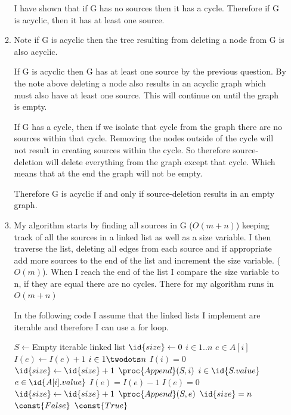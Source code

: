 \documentclass[10pt,a4paper]{article}
\begin{document}
\begin{enumerate}
\begin{enumerate}
I have shown that if G has no sources then it has a cycle. Therefore if G is acyclic, then it has at least one source.

\item
Note if G is acyclic then the tree resulting from deleting a node from G is also acyclic.

If G is acyclic then G has at least one source by the previous question. By the note above deleting a node also results in an acyclic graph which must also have at least one source. This will continue on until the graph is empty.

If G has a cycle, then if we isolate that cycle from the graph there are no sources within that cycle. Removing the nodes outside of the cycle will not result in creating sources within the cycle. So therefore source-deletion will delete everything from the graph except that cycle. Which means that at the end the graph will not be empty. 

Therefore G is acyclic if and only if source-deletion results in an empty graph.
\item My algorithm starts by finding all sources in G ($O(m + n)$) keeping track of all the sources in a linked list as well as a size variable. I then traverse the list, deleting all edges from each source and if appropriate add more sources to the end of the list and increment the size variable.
 ($O(m)$). When I reach the end of the list I compare the size variable to n, if they are equal there are no cycles. There for my algorithm runs in $O(m + n)$
 
 In the following code I assume that the linked lists I implement are iterable and therefore I can use a for loop.
 
 \begin{codebox}
 \li $S \gets $Empty iterable linked list
 \li $\id{size} \gets 0$
 \li \For $i \in 1..n$
 \li \Do
 \li \For $e \in A[i]$
 \li \Do
 \li $I(e) \gets I(e) + 1$
 	\End
 	\End
 \li \For $i \in 1 \twodots n$
 \li \Do
 \li \If $I(i) = 0$
 \li \Then
 \li $\id{size} \gets \id{size} + 1$
 \li $\proc{Append}(S, i)$
 \End
 \End
 \li \For $i \in \id{S.value}$
 \li \Do
 \li \For $e \in \id{A[i].value}$
 \li \Do 
 \li $I(e) = I(e) - 1$
 \li \If $I(e) = 0$
 \li \Then
 \li $\id{size} \gets \id{size} + 1 $
 \li $\proc{Append}(S, e)$
 \End
 \End
 \End
 \li \If $\id{size} = n$
 \li \Then
 \li \Return $\const{False}$
 \End
 \li \Return $\const{True}$
 \end{codebox}
\end{enumerate}
\end{enumerate}
\end{document}
